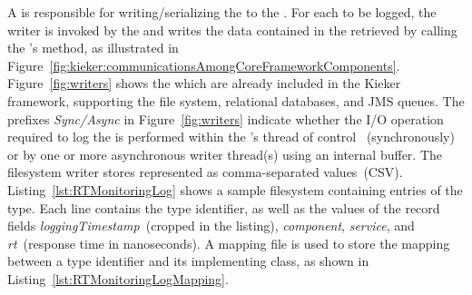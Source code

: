 \noindent A \MonitoringLogWriter{} is responsible for writing/serializing the %
\MonitoringRecords{} to the \MonitoringLog{}. %
For each \MonitoringRecord{} to be logged, the writer is invoked
by the \TpmonController{} and writes the data contained in the retrieved \MonitoringRecord{} %
by calling the \MonitoringRecord{}'s  method, %
as illustrated in Figure~\ref{fig:kieker:communicationsAmongCoreFrameworkComponents}. %
Figure~\ref{fig:writers} shows the \MonitoringLogWriters{} which are already included %
in the Kieker framework, supporting the file system, relational databases, and JMS %
queues. %
The prefixes \textit{Sync/Async} in Figure~\ref{fig:writers} indicate whether the I/O operation required to %
log the \MonitoringRecord{} is performed within the \MonitoringProbe{}'s thread of control~%
(synchronously) or by one or more asynchronous writer thread(s) using an internal buffer. %
The filesystem writer stores \MonitoringRecords{} represented as comma-separated values~(CSV). %
Listing~\ref{lst:RTMonitoringLog} shows a sample filesystem \MonitoringLog{} %
containing entries of the  \MonitoringRecord{} type. %
Each line contains the \MonitoringRecord{} type identifier, as well as the values
of the record fields \textit{loggingTimestamp}~(cropped in the listing), \textit{component}, \textit{service}, %
and \textit{rt}~(response time in nanoseconds). %
A mapping file is used to store the mapping between a \MonitoringRecord{} type %
identifier and its implementing class, as shown in Listing~\ref{lst:RTMonitoringLogMapping}. %
% 
% 
